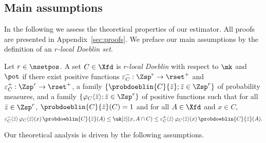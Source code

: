 \subsection{Main assumptions}

In the following we assess the theoretical properties of our estimator. All proofs are presented in Appendix~\ref{sec:proofs}. We preface our main assumptions by the definition of an \emph{$r$-local Doeblin set}.
\begin{definition} \label{defi:local-Doeblin}
Let $r \in \nsetpos$. A set $C \in \Xfd$ is $r$-\emph{local Doeblin} with respect to $\mk$ and $\pot$ if there exist positive functions $\varepsilon^-_C: \Zsp^r \to \rset^+$ and $\varepsilon^+_C: \Zsp^r \to \rset^+$, a family $\{ \probdoeblin{C}{\bar{z}} ; \bar{z} \in \Zsp^r \}$ of probability measures, and a family $\{\varphi_C \langle \bar{z} \rangle ; \bar{z} \in \Zsp^r \}$ of positive functions such that for all $\bar{z} \in \Zsp^r$, $\probdoeblin{C}{\bar{z}}(C) =1$ and for all $A \in \Xfd$ and $x \in C$,
\begin{equation*} \label{eq:definition-LD-set}
	\varepsilon^-_C \langle \bar{z} \rangle \, \varphi_C \langle \bar{z} \rangle(x) \, \probdoeblin{C}{\bar{z}} (A) \leq \uk[\bar{z}](x, A \cap C) \leq \varepsilon^+_C \langle \bar{z} \rangle \, \varphi_C \langle \bar{z} \rangle(x) \, \probdoeblin{C}{\bar{z}}(A).
\end{equation*}
\end{definition}

Our theoretical analysis is driven by the following assumptions. 

